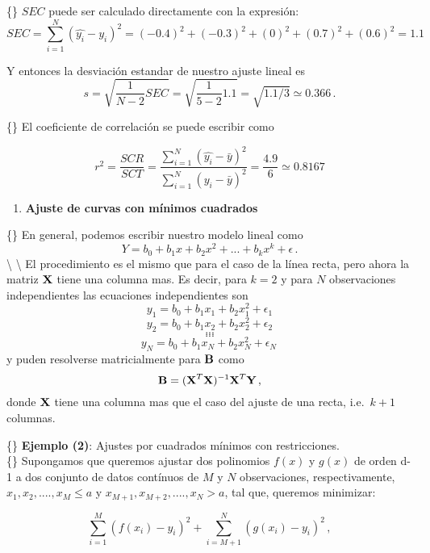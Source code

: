 \documentclass[
]{agujournal2019}
\providecommand{\tightlist}{%
  \setlength{\itemsep}{0pt}\setlength{\parskip}{0pt}}\usepackage{longtable,booktabs,array}
\begin{document}
\{\noindent\} \(SEC\) puede ser calculado directamente con la expresión:
\[SEC=\sum \limits^N_{i=1}(\hat{y_i}-y_i)^2=
   (-0.4)^2 + (-0.3)^2+(0)^2 + (0.7)^2 + (0.6)^2=1.1\]

\noindent Y entonces la desviación estandar de nuestro ajuste lineal es
\[s=\sqrt{\frac{1}{N-2}SEC}=\sqrt{\frac{1}{5-2}1.1}=\sqrt{1.1/3}\simeq0.366\,.\]

\{\noindent\} El coeficiente de correlación se puede escribir como

\[r^2=\frac{SCR}{SCT}=\frac{\sum\limits^N_{i=1}(\hat{y_i}-\bar{y})^2}{\sum\limits^N_{i=1}
({y_i}-\bar{y})^2}=\frac{4.9}{6}\simeq0.8167\]

\vspace{0.5cm}

\begin{enumerate}
\def\labelenumi{(\arabic{enumi})}
\setcounter{enumi}{3}
\tightlist
\item
  \textbf{Ajuste de curvas con mínimos cuadrados} ~
\end{enumerate}

\{\noindent\} En general, podemos escribir nuestro modelo lineal como
\[Y=b_0 + b_1x + b_2 x^2 + ... + b_k x^k + \epsilon\,.\]
\textbackslash{} \textbackslash{} \noindent El procedimiento es el mismo
que para el caso de la línea recta, pero ahora la matriz \({\textbf X}\)
tiene una columna mas. Es decir, para \(k=2\) y para \(N\) observaciones
independientes las ecuaciones independientes son
\[y_1=b_0 + b_1x_1 + b_2 x_1^2 + \epsilon_1\]
\[y_2=b_0 + b_1x_2 + b_2 x_2^2 + \epsilon_2\] \[...\] \[...\] \[...\]
\[y_N=b_0 + b_1x_N + b_2 x_N^2 + \epsilon_N\,\] y puden resolverse
matricialmente para \({\textbf B}\) como
\[{\textbf B}=({\textbf X}^T{\textbf X})^{-1}{\textbf X}^T{\textbf Y}\,,\]
donde \({\textbf X}\) tiene una columna mas que el caso del ajuste de
una recta, i.e.~\(k+1\) columnas.

\vspace{0.5cm}

\{\noindent\} \textbf{Ejemplo (2)}: Ajustes por cuadrados mínimos con
restricciones.\\

\{\noindent\} Supongamos que queremos ajustar dos polinomios \(f(x)\) y
\(g(x)\) de orden d-1 a dos conjunto de datos contínuos de \(M\) y \(N\)
observaciones, respectivamente, \(x_1, x_2, ....,x_M\leq a\) y
\(x_{M+1}, x_{M+2}, ....,x_N>a\), tal que, queremos minimizar:

\[\sum\limits^M_{i=1}(f(x_i)-y_i)^2 + \sum\limits^N_{i=M+1}(g(x_i)-y_i)^2\,,\]
\end{document}
